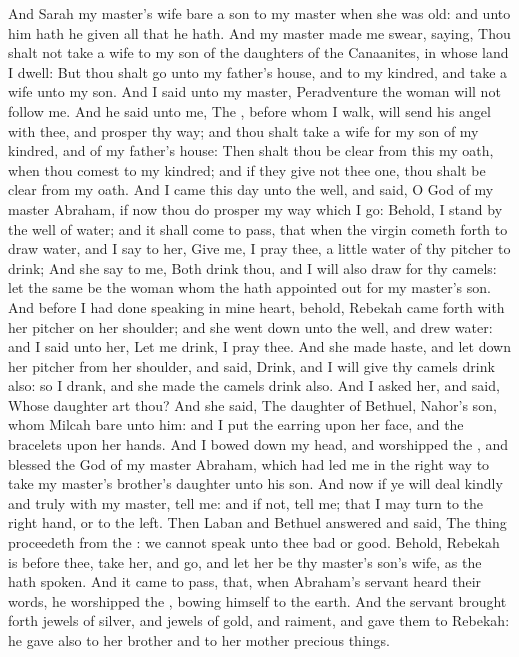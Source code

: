 \begin{biblechapter}
\verse And Sarah my master's wife bare a son to my master when she was old: and unto him hath he given all that he hath.
\verse And my master made me swear, saying, Thou shalt not take a wife to my son of the daughters of the Canaanites, in whose land I dwell:
\verse But thou shalt go unto my father's house, and to my kindred, and take a wife unto my son.
\verse And I said unto my master, Peradventure the woman will not follow me.
\verse And he said unto me, The \LORD, before whom I walk, will send his angel with thee, and prosper thy way; and thou shalt take a wife for my son of my kindred, and of my father's house:
\verse Then shalt thou be clear from this my oath, when thou comest to my kindred; and if they give not thee one, thou shalt be clear from my oath.
\verse And I came this day unto the well, and said, O \LORD God of my master Abraham, if now thou do prosper my way which I go:
\verse Behold, I stand by the well of water; and it shall come to pass, that when the virgin cometh forth to draw water, and I say to her, Give me, I pray thee, a little water of thy pitcher to drink;
\verse And she say to me, Both drink thou, and I will also draw for thy camels: let the same be the woman whom the \LORD hath appointed out for my master's son.
\verse And before I had done speaking in mine heart, behold, Rebekah came forth with her pitcher on her shoulder; and she went down unto the well, and drew water: and I said unto her, Let me drink, I pray thee.
\verse And she made haste, and let down her pitcher from her shoulder, and said, Drink, and I will give thy camels drink also: so I drank, and she made the camels drink also.
\verse And I asked her, and said, Whose daughter art thou? And she said, The daughter of Bethuel, Nahor's son, whom Milcah bare unto him: and I put the earring upon her face, and the bracelets upon her hands.
\verse And I bowed down my head, and worshipped the \LORD, and blessed the \LORD God of my master Abraham, which had led me in the right way to take my master's brother's daughter unto his son.
\verse And now if ye will deal kindly and truly with my master, tell me: and if not, tell me; that I may turn to the right hand, or to the left.
\verse Then Laban and Bethuel answered and said, The thing proceedeth from the \LORD: we cannot speak unto thee bad or good.
\verse Behold, Rebekah is before thee, take her, and go, and let her be thy master's son's wife, as the \LORD hath spoken.
\verse And it came to pass, that, when Abraham's servant heard their words, he worshipped the \LORD, bowing himself to the earth.
\verse And the servant brought forth jewels of silver, and jewels of gold, and raiment, and gave them to Rebekah: he gave also to her brother and to her mother precious things.

\end{biblechapter}

